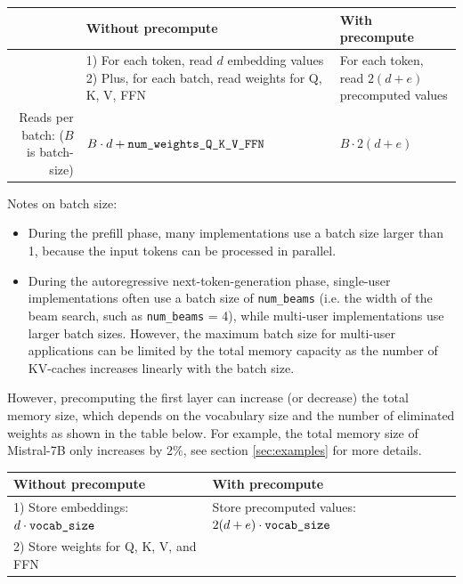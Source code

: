 \documentclass{article}
\begin{document}
\begingroup \renewcommand{\arraystretch}{1.3} %
\begin{center} \begin{tabular}{rll} \hline
  & \textbf{Without precompute}            & \textbf{With precompute}    \\ \hline
    & \makecell[l]{1) For each token, read $d$ embedding values          \\
      2) Plus, for each batch, read weights for Q, K, V, FFN}
    & \makecell[l]{For each token, read $2(d+e)$ \\  precomputed values} \\ \hline
  \makecell[l]{Reads per batch: \\ ($B$ is batch-size)} & $B \cdot d + \verb+num_weights_Q_K_V_FFN+$ & $B \cdot 2(d+e)$ \\ \hline
\end{tabular} \end{center} \endgroup

Notes on batch size:
\begin{itemize}[topsep=-1pt, itemsep=-1pt]
  \item During the prefill phase, many implementations use a batch size larger than 1, because the input tokens can be processed in parallel.
  \item During the autoregressive next-token-generation phase, single-user implementations often use a batch size of \verb+num_beams+ (i.e. the width of the beam search, such as \verb+num_beams+ = 4), while multi-user implementations use larger batch sizes. However, the maximum batch size for multi-user applications can be limited by the total memory capacity as the number of KV-caches increases linearly with the batch size.
\end{itemize}

However, precomputing the first layer can increase (or decrease) the total memory size, which depends on the vocabulary size and the number of eliminated weights as shown in the table below. For example, the total memory size of Mistral-7B only increases by 2\%, see section \ref{sec:examples} for more details.

\begingroup \renewcommand{\arraystretch}{1.3} %
\begin{center} \begin{tabular}{ll} \hline
  \textbf{Without precompute}                      & \textbf{With precompute} \\ \hline
  1) Store embeddings: $d \cdot \verb+vocab_size+$ & Store precomputed values: $2(d+e) \cdot \verb+vocab_size+$ \\
  2) Store weights for Q, K, V, and FFN            &                          \\ \hline
\end{tabular} \end{center} \endgroup
\end{document}
